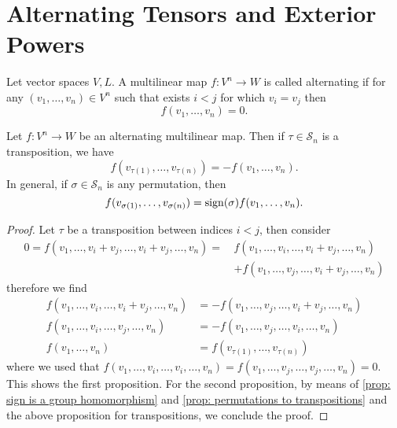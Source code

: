 \section{Alternating Tensors and Exterior Powers}

\begin{definition}
  \label{def: alternating map}
  Let vector spaces \(V, L\). A multilinear map \(f: V^n \to W\) is called
  alternating if for any \((v_1, \dots, v_n) \in V^n\) such
  that exists \(i < j\) for which \(v_i = v_j\) then
  \[
    f(v_1, \dots, v_n) = 0.
  \]
\end{definition}

\begin{proposition}\label{prop: alternating map property}
  Let \(f: V^n \to W\) be an alternating multilinear map. Then if \(\tau \in
  \mathcal S_n\) is a transposition, we have
  \[
    f(v_{\tau(1)}, \dots, v_{\tau(n)}) = - f(v_1, \dots, v_n).
  \]
  In general, if \(\sigma \in \mathcal S_n\) is any permutation, then
  \[
    f(v_{\sigma(1)}, \dots, v_{\sigma(n)}) = \operatorname{sign}(\sigma) f(v_1,
    \dots, v_n).
  \]
\end{proposition}

\begin{proof}
  Let \(\tau\) be a transposition between indices \(i < j\), then consider
  \begin{align*}
    0 = f(v_1, \dots, v_i + v_j, \dots, v_i + v_j, \dots, v_n)
    =\, & f(v_1, \dots, v_i, \dots, v_i + v_j, \dots, v_n) \\
      & + f(v_1, \dots, v_j, \dots, v_i + v_j, \dots, v_n)
  \end{align*}
  therefore we find
  \begin{align*}
    f(v_1, \dots, v_i, \dots, v_i + v_j, \dots, v_n)
    &= - f(v_1, \dots, v_j, \dots, v_i + v_j, \dots, v_n) \\
    f(v_1, \dots, v_i, \dots, v_j, \dots, v_n)
    &= - f(v_1, \dots, v_j, \dots, v_i, \dots, v_n) \\
    f(v_1, \dots, v_n)
    &= f(v_{\tau(1)}, \dots, v_{\tau(n)})
  \end{align*}
  where we used that \(f(v_1, \dots, v_i, \dots, v_i, \dots, v_n) = f(v_1,
  \dots, v_j, \dots, v_j, \dots, v_n) = 0\). This shows the first proposition.
  For the second proposition, by means of \cref{prop: sign is a group
  homomorphism} and \cref{prop: permutations to transpositions} and the above
  proposition for transpositions, we conclude the proof.
\end{proof}

